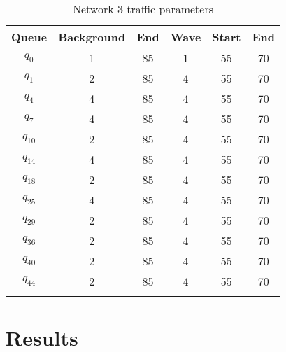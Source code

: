 \begin{table}[h]
\caption{Network 3 traffic parameters}
\label{tab:net3wave}
\centering
\begin{tabular}{cccccc}
\toprule
Queue & Background & End & Wave & Start &End\\ 
\midrule
$q_0$ & 1 & 85 & 1 & 55 & 70\\
$q_1$ & 2 & 85 & 4 & 55 & 70\\
$q_4$ & 4 & 85 & 4 & 55 & 70\\
$q_7$ & 4 & 85 & 4 & 55 & 70\\
$q_{10}$ & 2 & 85 & 4 & 55 & 70\\
$q_{14}$ & 4 & 85 & 4 & 55 & 70\\
$q_{18}$ & 2 & 85 & 4 & 55 & 70\\
$q_{25}$ & 4 & 85 & 4 & 55 & 70\\
$q_{29}$ & 2 & 85 & 4 & 55 & 70\\
$q_{36}$ & 2 & 85 & 4 & 55 & 70\\
$q_{40}$ & 2 & 85 & 4 & 55 & 70\\
$q_{44}$ & 2 & 85 & 4 & 55 & 70\\
\bottomrule\\
\end{tabular}
\end{table}

\section{Results}

